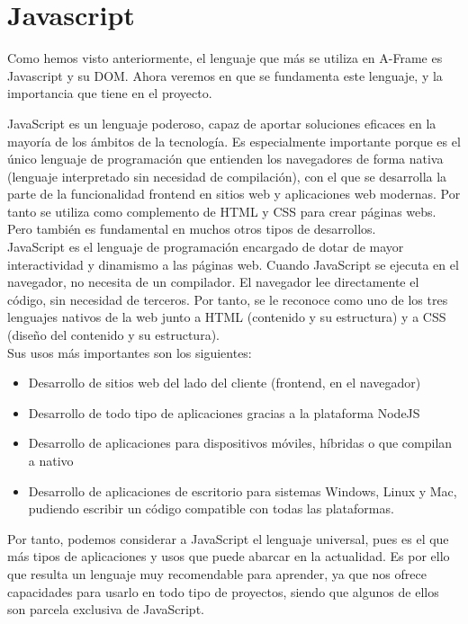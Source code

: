 \documentclass[a4paper, 12pt]{book}
\begin{document}
\section{Javascript} 
\label{sec:javascript}

Como hemos visto anteriormente, el lenguaje que más se utiliza en A-Frame es Javascript y su DOM.
Ahora veremos en que se fundamenta este lenguaje, y la importancia que tiene en el proyecto.


JavaScript es un lenguaje poderoso, capaz de aportar soluciones eficaces en la mayoría de los ámbitos de la tecnología.
Es especialmente importante porque es el único lenguaje de programación que entienden los navegadores de forma nativa (lenguaje interpretado sin necesidad de compilación), con el que se desarrolla la parte de la funcionalidad frontend en sitios web y aplicaciones web modernas. Por tanto se utiliza como complemento de HTML y CSS para crear páginas webs. Pero también es fundamental en muchos otros tipos de desarrollos.\\
JavaScript es el lenguaje de programación encargado de dotar de mayor interactividad y dinamismo a las páginas web. Cuando JavaScript se ejecuta en el navegador, no necesita de un compilador. El navegador lee directamente el código, sin necesidad de terceros. Por tanto, se le reconoce como uno de los tres lenguajes nativos de la web junto a HTML (contenido y su estructura) y a CSS (diseño del contenido y su estructura).\\

Sus usos más importantes son los siguientes:
\begin{itemize}
    
    \item  Desarrollo de sitios web del lado del cliente (frontend, en el navegador)
    \item  Desarrollo de todo tipo de aplicaciones gracias a la plataforma NodeJS
    \item  Desarrollo de aplicaciones para dispositivos móviles, híbridas o que compilan a nativo
    \item  Desarrollo de aplicaciones de escritorio para sistemas Windows, Linux y Mac, pudiendo escribir un código compatible con todas las plataformas.


    
\end{itemize}
Por tanto, podemos considerar a JavaScript el lenguaje universal, pues es el que más tipos de aplicaciones y usos que puede abarcar en la actualidad. Es por ello que resulta un lenguaje muy recomendable para aprender, ya que nos ofrece capacidades para usarlo en todo tipo de proyectos, siendo que algunos de ellos son parcela exclusiva de JavaScript.
\end{document}
